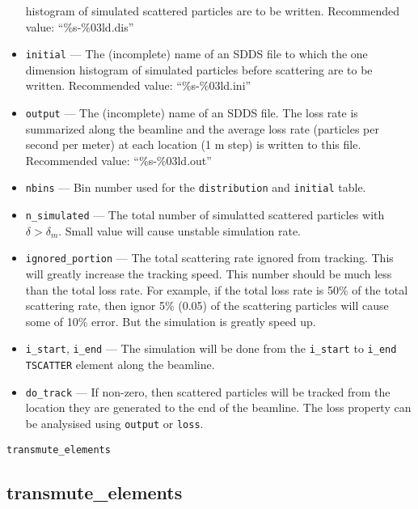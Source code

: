 \documentclass[11pt]{article}
\begin{document}
\begin{itemize}
   histogram of simulated scattered particles are to be written. Recommended value: ``\%s-\%03ld.dis'' 
   \item \verb|initial| --- The (incomplete) name of an SDDS file to which the one dimension 
   histogram of simulated particles before scattering are to be written. Recommended value: ``\%s-\%03ld.ini''
   \item \verb|output| --- The (incomplete) name of an SDDS file. The loss rate is summarized along the
   beamline and the average loss rate (particles per second per meter) at each location (1 m step) 
   is written to this file. Recommended value: ``\%s-\%03ld.out'' 
   \item \verb|nbins| --- Bin number used for the \verb|distribution| and \verb|initial| table.
   \item \verb|n_simulated| --- The total number of simulatted scattered particles with $\delta>\delta_m$. Small
   value will cause unstable simulation rate.
   \item \verb|ignored_portion| --- The total scattering rate ignored from tracking. This will greatly 
   increase the tracking speed. This number should be much less than the total loss rate. For example, if
   the total loss rate is 50\% of the total scattering rate, then ignor 5\% (0.05) of the scattering particles
   will cause some of 10\% error. But the simulation is greatly speed up.
   \item \verb|i_start|, \verb|i_end| --- The simulation will be done from the \verb|i_start| to \verb|i_end|
   \verb|TSCATTER| element along the beamline.    
   \item \verb|do_track| --- If non-zero, then scattered particles will be tracked from the location they are
   generated to the end of the beamline. The loss property can be analysised using \verb|output| or \verb|loss|. 
\end{itemize}

\begin{latexonly}
\newpage
\begin{center}{\Large\verb|transmute_elements|}\end{center}
\end{latexonly}
\subsection{transmute\_elements \label{subsec:transmuteelements}}
\end{document}
